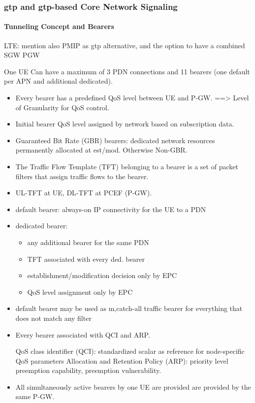 \subsubsection{\texorpdfstring{\acrshort{gtp}}{GTP} and \texorpdfstring{\acrshort{gtp}}{GTP}-based Core Network Signaling}
\label{c4:sec:gtp}









\paragraph{Tunneling Concept and Bearers}

LTE: mention also \gls{PMIP} as \gls{gtp} alternative, and the option to have a combined \gls{SGW} \gls{PGW}


One UE Can have a maximum of 3 \gls{PDN} connections and 11 bearers (one default per \gls{APN} and additional dedicated).



\begin{itemize}
\item 	Every bearer has a predefined QoS level between UE and P-GW.
		==> Level of Granularity for QoS control.
\item	Initial bearer QoS level assigned by network based on subscription data.
\item	Guaranteed Bit Rate (GBR) bearers: dedicated network resources permanently allocated at est/mod. Otherwise Non-GBR.
\item	The Traffic Flow Template (TFT) belonging to a bearer is a set of packet filters that assign traffic flows to the bearer.
\item	UL-TFT at UE, DL-TFT at \gls{PCEF} (P-GW).
\item 	default bearer: always-on IP connectivity for the UE to a PDN
\item	dedicated bearer:   
			\begin{itemize}
				\item any additional bearer for the same PDN
				\item \gls{TFT} associated with every ded. bearer
				\item establishment/modification decision only by \gls{EPC}
				\item QoS level assignment only by \gls{EPC}
			\end{itemize}

\item	default bearer may be used as {m,c}atch-all traffic bearer for everything that does not match any filter
\item	Every bearer associated with QCI and ARP.

QoS class identifier (QCI): standardized scalar as reference for node-specific QoS parameters
Allocation and Retention Policy (ARP): priority level preemption capability, preemption vulnerability.

\item	All simultaneously active bearers by one UE are provided are provided by the same P-GW.
\end{itemize}



